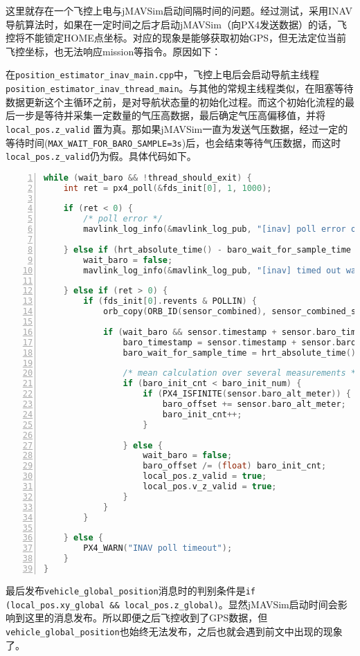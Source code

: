 这里就存在一个飞控上电与jMAVSim启动间隔时间的问题。经过测试，采用INAV导航算法时，如果在一定时间之后才启动jMAVSim（向PX4发送数据）的话，飞控将不能锁定HOME点坐标。对应的现象是能够获取初始GPS，但无法定位当前飞控坐标，也无法响应mission等指令。原因如下：

在\texttt{position_estimator_inav_main.cpp}中，飞控上电后会启动导航主线程\texttt{position_estimator_inav_thread_main}。与其他的常规主线程类似，在阻塞等待数据更新这个主循环之前，是对导航状态量的初始化过程。而这个初始化流程的最后一步是等待并采集一定数量的气压高数据，最后确定气压高偏移值，并将\texttt{local_pos.z_valid} 置为真。那如果jMAVSim一直为发送气压数据，经过一定的等待时间(\texttt{MAX_WAIT_FOR_BARO_SAMPLE=3s})后，也会结束等待气压数据，而这时\texttt{local_pos.z_valid}仍为假。具体代码如下。
\begin{lstlisting}[language=C++,numbers=left,firstnumber = 1,breaklines = true,numberstyle=\tiny,keywordstyle=\color{blue!70},commentstyle=\color{red!50!green!50!blue!50},frame=shadowbox, rulesepcolor=\color{red!20!green!20!blue!20}]
while (wait_baro && !thread_should_exit) {
	int ret = px4_poll(&fds_init[0], 1, 1000);

	if (ret < 0) {
		/* poll error */
		mavlink_log_info(&mavlink_log_pub, "[inav] poll error on init");

	} else if (hrt_absolute_time() - baro_wait_for_sample_time > MAX_WAIT_FOR_BARO_SAMPLE) {
		wait_baro = false;
		mavlink_log_info(&mavlink_log_pub, "[inav] timed out waiting for a baro sample");

	} else if (ret > 0) {
		if (fds_init[0].revents & POLLIN) {
			orb_copy(ORB_ID(sensor_combined), sensor_combined_sub, &sensor);

			if (wait_baro && sensor.timestamp + sensor.baro_timestamp_relative != baro_timestamp) {
				baro_timestamp = sensor.timestamp + sensor.baro_timestamp_relative;
				baro_wait_for_sample_time = hrt_absolute_time();

				/* mean calculation over several measurements */
				if (baro_init_cnt < baro_init_num) {
					if (PX4_ISFINITE(sensor.baro_alt_meter)) {
						baro_offset += sensor.baro_alt_meter;
						baro_init_cnt++;
					}

				} else {
					wait_baro = false;
					baro_offset /= (float) baro_init_cnt;
					local_pos.z_valid = true;
					local_pos.v_z_valid = true;
				}
			}
		}

	} else {
		PX4_WARN("INAV poll timeout");
	}
}
\end{lstlisting}

最后发布\texttt{vehicle_global_position}消息时的判别条件是\texttt{if (local_pos.xy_global \&\& local_pos.z_global)}。显然jMAVSim启动时间会影响到这里的消息发布。所以即便之后飞控收到了GPS数据，但\texttt{vehicle_global_position}也始终无法发布，之后也就会遇到前文中出现的现象了。



